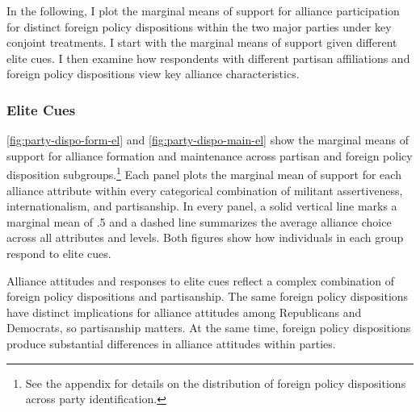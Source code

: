 \documentclass[12pt]{article}
\begin{document}
In the following, I plot the marginal means of support for alliance participation for distinct foreign policy dispositions within the two major parties under key conjoint treatments.  
I start with the marginal means of support given different elite cues. 
I then examine how respondents with different partisan affiliations and foreign policy dispositions view key alliance characteristics. 


\subsubsection{Elite Cues}


\autoref{fig:party-dispo-form-el} and \autoref{fig:party-dispo-main-el} show the marginal means of support for alliance formation and maintenance across partisan and foreign policy disposition subgroups.\footnote{See the appendix for details on the distribution of foreign policy dispositions across party identification.} 
Each panel plots the marginal mean of support for each alliance attribute within every categorical combination of militant assertiveness, internationalism, and partisanship.
In every panel, a solid vertical line marks a marginal mean of .5 and a dashed line summarizes the average alliance choice across all attributes and levels.  
Both figures show how individuals in each group respond to elite cues. 


Alliance attitudes and responses to elite cues reflect a complex combination of foreign policy dispositions and partisanship. 
The same foreign policy dispositions have distinct implications for alliance attitudes among Republicans and Democrats, so partisanship matters.
At the same time, foreign policy dispositions produce substantial differences in alliance attitudes within parties.  
\end{document}
